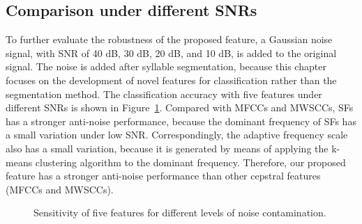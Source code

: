 \begin{table}[htb!]
\centering
\caption{Classification accuracy (\%) for classifying different number of frog species with four feature sets.}
\label{tab:manySpecies}
\end{table}


\subsection{Comparison under different SNRs}
To further evaluate the robustness of the proposed feature, a Gaussian noise signal, with SNR of 40 dB, 30 dB, 20 dB, and 10 dB, is added to the original signal. The noise is added after syllable segmentation, because this chapter focuses on the development of novel features for classification rather than the segmentation method. The classification accuracy with five features under different SNRs is shown in Figure~\ref{fig:snr}. Compared with MFCCs and MWSCCs, SFs has a stronger anti-noise performance, because the dominant frequency of SFs has a small variation under low SNR. Correspondingly, the adaptive frequency scale also has a small variation, because it is generated by means of applying the k-means clustering algorithm to the dominant frequency. Therefore, our proposed feature has a stronger anti-noise performance than other cepstral features (MFCCs and MWSCCs). 

\begin{figure}[htb!] %
\caption{Sensitivity of five features for
different levels of noise contamination.}
\label{fig:snr} 
\end{figure}

